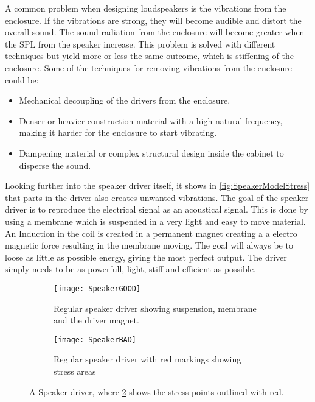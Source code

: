 A common problem when designing loudspeakers is the vibrations from the enclosure. If the vibrations are strong, they will become audible and distort the overall sound. The sound radiation from the enclosure will become greater when the \gls{SPL} from the speaker increase. This problem is solved with different techniques but yield more or less the same outcome, which is stiffening of the enclosure. Some of the techniques for removing vibrations from the enclosure could be:
\begin{itemize}
\item Mechanical decoupling of the drivers from the enclosure.
\item Denser or heavier construction material with a high natural frequency, making it harder for the enclosure to start vibrating.
\item Dampening material or complex structural design inside the cabinet to disperse the sound.
\end{itemize}


Looking further into the speaker driver itself, it shows in \autoref{fig:SpeakerModelStress} that parts in the driver also creates unwanted vibrations. The goal of the speaker driver is to reproduce the electrical signal as an acoustical signal. This is done by using a membrane which is suspended in a very light and easy to move material. An Induction in the coil is created in a permanent magnet creating a a electro magnetic force resulting in the membrane moving. The goal will always be to loose as little as possible energy, giving the most perfect output. The driver simply needs to be as powerfull, light, stiff and efficient as possible.

\begin{figure}[H]
\centering
\begin{subfigure}[t]{0.47\textwidth}
\texttt{[image: SpeakerGOOD]}
	\caption{Regular speaker driver showing suspension, membrane and the driver magnet.}
	\label{fig:regularspeaker}
\end{subfigure}
\hspace{6mm} 
\begin{subfigure}[t]{0.47\textwidth}
\texttt{[image: SpeakerBAD]}
	\caption{Regular speaker driver with red markings showing stress areas}
	\label{fig:badspeaker}
\end{subfigure}
\caption{A Speaker driver, where \ref{fig:badspeaker} shows the stress points outlined with red.}
\label{fig:SpeakerModelStress}
\end{figure}

